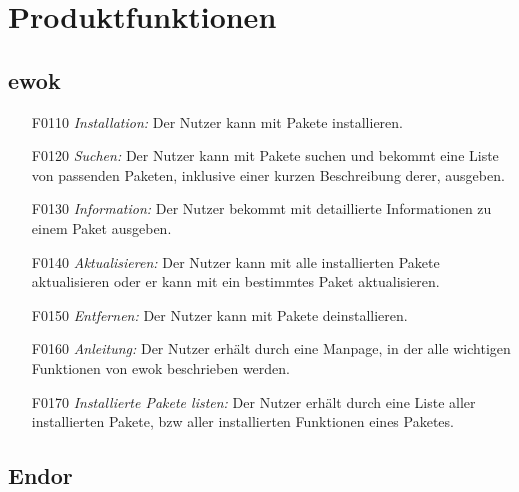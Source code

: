 \chapter{Produktfunktionen}

\section{ewok}

\begin{itemize}
	\item[F0110] \textit{Installation:} Der Nutzer kann mit  Pakete installieren.
	\item[F0120] \textit{Suchen:} Der Nutzer kann mit  Pakete suchen und bekommt eine Liste von passenden Paketen, inklusive einer kurzen Beschreibung derer, ausgeben.
	\item[F0130] \textit{Information:} Der Nutzer bekommt mit  detaillierte Informationen zu einem Paket ausgeben.
	\item[F0140] \textit{Aktualisieren:} Der Nutzer kann mit  alle installierten Pakete aktualisieren oder er kann mit  ein bestimmtes Paket aktualisieren.
	\item[F0150] \textit{Entfernen:} Der Nutzer kann mit  Pakete deinstallieren.
	\item[F0160] \textit{Anleitung:} Der Nutzer erhält durch  eine Manpage, in der alle wichtigen Funktionen von ewok beschrieben werden.
	\item[F0170] \textit{Installierte Pakete listen:} Der Nutzer erhält durch  eine Liste aller installierten Pakete, bzw aller installierten Funktionen eines Paketes.


\end{itemize}

\section{Endor}


